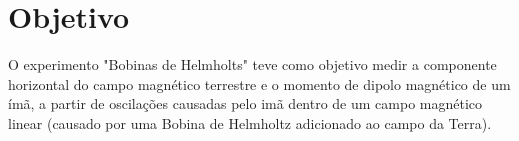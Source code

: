 \section{Objetivo}
    O experimento "Bobinas de Helmholts" teve como  
    objetivo medir a componente horizontal do campo
    magnético terrestre e o momento de dipolo 
    magnético de um ímã, a partir de oscilações
    causadas pelo imã dentro de um campo magnético
    linear (causado por uma Bobina de Helmholtz 
    adicionado ao campo da Terra).
